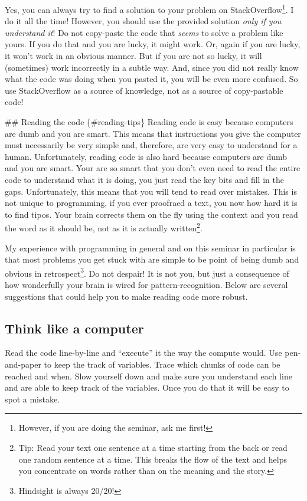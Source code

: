 \documentclass[
]{book}
\begin{document}
Yes, you can always try to find a solution to your problem on StackOverflow\footnote{However, if you are doing the seminar, ask me first!}. I do it all the time! However, you should use the provided solution \emph{only if you understand it}! Do not copy-paste the code that \emph{seems} to solve a problem like yours. If you do that and you are lucky, it might work. Or, again if you are lucky, it won't work in an obvious manner. But if you are not so lucky, it will (sometimes) work incorrectly in a subtle way. And, since you did not really know what the code was doing when you pasted it, you will be even more confused. So use StackOverflow as a source of knowledge, not as a source of copy-pastable code!

\#\# Reading the code \{\#reading-tips\}
Reading code is easy because computers are dumb and you are smart. This means that instructions you give the computer must necessarily be very simple and, therefore, are very easy to understand for a human. Unfortunately, reading code is also hard because computers are dumb and you are smart. Your are so smart that you don't even need to read the entire code to understand what it is doing, you just read the key bits and fill in the gaps. Unfortunately, this means that you will tend to read over mistakes. This is not unique to programming, if you ever proofraed a text, you now how hard it is to find tipos. Your brain corrects them on the fly using the context and you read the word as it should be, not as it is actually written\footnote{Tip: Read your text one sentence at a time starting from the back or read one random sentence at a time. This breaks the flow of the text and helps you concentrate on words rather than on the meaning and the story.}.

My experience with programming in general and on this seminar in particular is that most problems you get stuck with are simple to be point of being dumb and obvious in retrospect\footnote{Hindsight is always 20/20!}. Do not despair! It is not you, but just a consequence of how wonderfully your brain is wired for pattern-recognition. Below are several suggestions that could help you to make reading code more robust.

\hypertarget{think-like-a-computer}{%
\subsection{Think like a computer}\label{think-like-a-computer}}

Read the code line-by-line and ``execute'' it the way the compute would. Use pen-and-paper to keep the track of variables. Trace which chunks of code can be reached and when. Slow yourself down and make sure you understand each line and are able to keep track of the variables. Once you do that it will be easy to spot a mistake.
\end{document}
